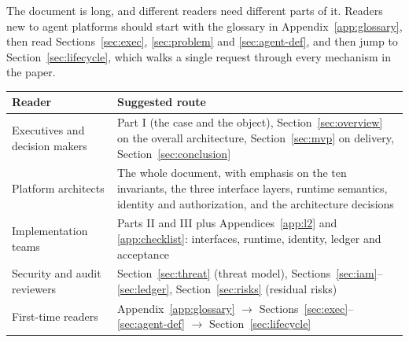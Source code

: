 The document is long, and different readers need different parts of it. Readers new to agent platforms should start with the glossary in Appendix~\ref{app:glossary}, then read Sections~\ref{sec:exec}, \ref{sec:problem} and \ref{sec:agent-def}, and then jump to Section~\ref{sec:lifecycle}, which walks a single request through every mechanism in the paper.

\begin{tabularx}{\textwidth}{@{}L{3.6cm}Y@{}}
  \toprule
  \textbf{Reader} & \textbf{Suggested route}\\
  \midrule
  Executives and decision makers & Part I (the case and the object), Section~\ref{sec:overview} on the overall architecture, Section~\ref{sec:mvp} on delivery, Section~\ref{sec:conclusion}\\
  Platform architects & The whole document, with emphasis on the ten invariants, the three interface layers, runtime semantics, identity and authorization, and the architecture decisions\\
  Implementation teams & Parts II and III plus Appendices~\ref{app:l2} and \ref{app:checklist}: interfaces, runtime, identity, ledger and acceptance\\
  Security and audit reviewers & Section~\ref{sec:threat} (threat model), Sections~\ref{sec:iam}--\ref{sec:ledger}, Section~\ref{sec:risks} (residual risks)\\
  First-time readers & Appendix~\ref{app:glossary} $\rightarrow$ Sections~\ref{sec:exec}--\ref{sec:agent-def} $\rightarrow$ Section~\ref{sec:lifecycle}\\
  \bottomrule
\end{tabularx}

\newpage
\begingroup
\footnotesize
\setlength{\parskip}{0pt}
\renewcommand{\baselinestretch}{0.92}\selectfont
\tableofcontents
\vspace{1.2em}
\listoffigures
\vspace{1.2em}
\listoftables
\endgroup
\newpage
{}
